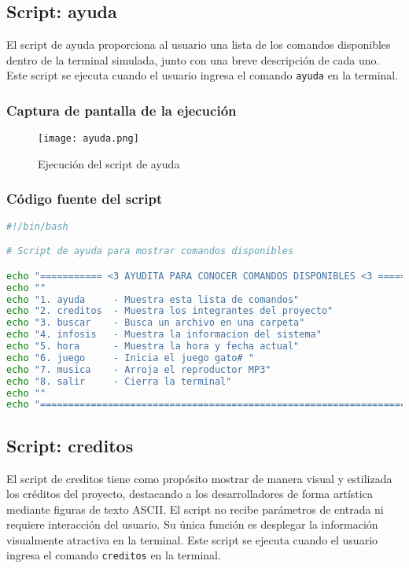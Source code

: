 \documentclass{article}
\begin{document}
  \subsection{Script: ayuda}

El script de ayuda proporciona al usuario una lista de los comandos disponibles dentro de la terminal simulada, junto con una breve descripción de cada uno.  
Este script se ejecuta cuando el usuario ingresa el comando \texttt{ayuda} en la terminal.

\subsubsection{Captura de pantalla de la ejecución}

\begin{figure}[h!]
\centering
\texttt{[image: ayuda.png]}
\caption{Ejecución del script de ayuda}
\end{figure}

\subsubsection{Código fuente del script}

\begin{lstlisting}[language=bash]
#!/bin/bash

# Script de ayuda para mostrar comandos disponibles

echo "=========== <3 AYUDITA PARA CONOCER COMANDOS DISPONIBLES <3 ==========="
echo ""
echo "1. ayuda     - Muestra esta lista de comandos"
echo "2. creditos  - Muestra los integrantes del proyecto"
echo "3. buscar    - Busca un archivo en una carpeta"
echo "4. infosis   - Muestra la informacion del sistema"
echo "5. hora      - Muestra la hora y fecha actual"
echo "6. juego     - Inicia el juego gato# "
echo "7. musica    - Arroja el reproductor MP3"
echo "8. salir     - Cierra la terminal"
echo ""
echo "========================================================================"

\end{lstlisting}
\pagebreak
\subsection{Script: creditos}

El script de creditos tiene como propósito mostrar de manera visual y estilizada los créditos del proyecto, destacando a los desarrolladores de forma artística mediante figuras de texto ASCII.
El script no recibe parámetros de entrada ni requiere interacción del usuario. Su única función es desplegar la información visualmente atractiva en la terminal.  
Este script se ejecuta cuando el usuario ingresa el comando \texttt{creditos} en la terminal.
\end{document}
